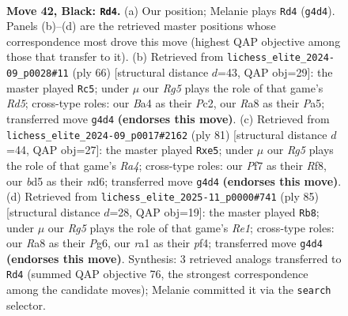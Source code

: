 \documentclass[11pt]{article}
\begin{document}
\clearpage

\begin{figure}[p]\centering
\begin{subfigure}{0.46\textwidth}\centering
\resizebox{\linewidth}{!}{%
\newchessgame
\chessboard[
  setfen={r7/1p3p2/p5k1/3BP2p/bP4r1/P6K/8/R4R2 b - - 0 42},
  showmover=false,
  pgfstyle=straightmove, color=movearrow, markmove={g4-d4}
]}
\caption{}
\end{subfigure}\hfill
\begin{subfigure}{0.46\textwidth}\centering
\resizebox{\linewidth}{!}{%
\newchessgame
\chessboard[
  setfen={1r5r/2p5/p3k1p1/P2Rp3/7P/1P4P1/1KP5/3R4 w - - 0 34},
  showmover=false,
  pgfstyle=straightmove, color=movearrow, markmove={d5-c5}
]}
\caption{}
\end{subfigure}
\\[4pt]
\begin{subfigure}{0.46\textwidth}\centering
\resizebox{\linewidth}{!}{%
\newchessgame
\chessboard[
  setfen={5rk1/R4p2/P2NpP1p/r3P1pb/1K6/1R6/7P/8 b - - 3 41},
  showmover=false,
  pgfstyle=straightmove, color=movearrow, markmove={a5-e5}
]}
\caption{}
\end{subfigure}\hfill
\begin{subfigure}{0.46\textwidth}\centering
\resizebox{\linewidth}{!}{%
\newchessgame
\chessboard[
  setfen={4r1k1/7p/p3p1p1/3bP3/3p1P2/2r4B/P6K/3R1R2 b - - 4 43},
  showmover=false,
  pgfstyle=straightmove, color=movearrow, markmove={e8-b8}
]}
\caption{}
\end{subfigure}
\caption{\textbf{Move 42, Black: \texttt{Rd4}.} (a) Our position; Melanie plays \texttt{Rd4} (\texttt{g4d4}). Panels (b)--(d) are the retrieved master positions whose correspondence most drove this move (highest QAP objective among those that transfer to it). (b) Retrieved from \texttt{lichess\_elite\_2024-09\_p0028\#11} (ply 66) [structural distance $d$=43, QAP obj=29]: the master played \texttt{Rc5}; under $\mu$ our \emph{Rg5} plays the role of that game's \emph{Rd5}; cross-type roles: our \emph{B}a4 as their \emph{P}c2, our \emph{R}a8 as their \emph{P}a5; transferred move \texttt{g4d4} \textbf{(endorses this move)}. (c) Retrieved from \texttt{lichess\_elite\_2024-09\_p0017\#2162} (ply 81) [structural distance $d$=44, QAP obj=27]: the master played \texttt{Rxe5}; under $\mu$ our \emph{Rg5} plays the role of that game's \emph{Ra4}; cross-type roles: our \emph{P}f7 as their \emph{R}f8, our \emph{b}d5 as their \emph{n}d6; transferred move \texttt{g4d4} \textbf{(endorses this move)}. (d) Retrieved from \texttt{lichess\_elite\_2025-11\_p0000\#741} (ply 85) [structural distance $d$=28, QAP obj=19]: the master played \texttt{Rb8}; under $\mu$ our \emph{Rg5} plays the role of that game's \emph{Re1}; cross-type roles: our \emph{R}a8 as their \emph{P}g6, our \emph{r}a1 as their \emph{p}f4; transferred move \texttt{g4d4} \textbf{(endorses this move)}. Synthesis: 3 retrieved analogs transferred to \texttt{Rd4} (summed QAP objective 76, the strongest correspondence among the candidate moves); Melanie committed it via the \texttt{search} selector.}
\label{fig:thought-m83}
\end{figure}
\end{document}
